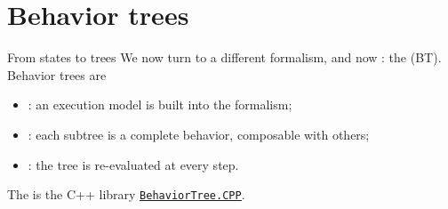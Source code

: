 
\section{Behavior trees}
\graphicspath{{figs/section2/}}

\begin{frame}{From states to trees}
  \justifying
  We now turn to a different formalism,  and now : the  (BT).\\
  \bigskip
  Behavior trees are
  \begin{itemize}
    \item {}: an execution model is built into the formalism;
    \item {}: each subtree is a complete behavior, composable with others;
    \item {}: the tree is re-evaluated at every step.
  \end{itemize}
  \bigskip
  The  is the C++ library \href{https://www.behaviortree.dev}{\color{blue}\underline{\texttt{BehaviorTree.CPP}}}.
\end{frame}

